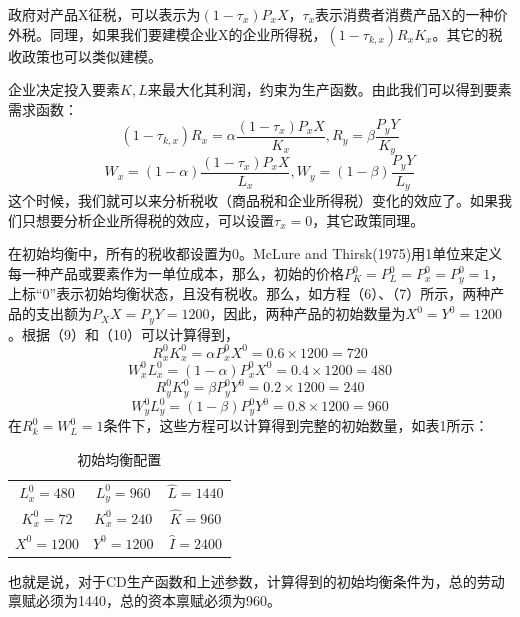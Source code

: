 \documentclass[cn,12pt,math=newtx,citestyle=gb7714-2015,bibstyle=gb7714-2015]{elegantbook}
\begin{document}
	政府对产品X征税，可以表示为$(1-\tau_x)P_xX$，$\tau_x$表示消费者消费产品X的一种价外税。同理，如果我们要建模企业X的企业所得税，$(1-\tau_{k,x})R_xK_x$。其它的税收政策也可以类似建模。
	
	企业决定投入要素$K,L$来最大化其利润，约束为生产函数。由此我们可以得到要素需求函数：
	\begin{equation}
		(1-\tau_{k,x})R_x=\alpha \frac{(1-\tau_x)P_xX}{K_x},R_y=\beta \frac{P_yY}{K_y}
	\end{equation}
	\begin{equation}
		W_x=(1-\alpha) \frac{(1-\tau_x)P_xX}{L_x},W_y=(1-\beta) \frac{P_yY}{L_y}
	\end{equation}
	这个时候，我们就可以来分析税收（商品税和企业所得税）变化的效应了。如果我们只想要分析企业所得税的效应，可以设置$\tau_x=0$，其它政策同理。
	
	在初始均衡中，所有的税收都设置为0。McLure and Thirsk(1975)用1单位来定义每一种产品或要素作为一单位成本，那么，初始的价格$P_K^0=P_L^0=P_x^0=P_y^0=1$，上标“0”表示初始均衡状态，且没有税收。那么，如方程（6）、（7）所示，两种产品的支出额为$P_XX=P_yY=1200$，因此，两种产品的初始数量为$X^0=Y^0=1200$。根据（9）和（10）可以计算得到，
	\begin{equation}
		R_x^0K_x^0=\alpha P_x^0X^0=0.6 \times 1200=720
	\end{equation}
	\begin{equation}
		W_x^0L_x^0=(1-\alpha) P_x^0X^0=0.4 \times 1200=480
	\end{equation}
	\begin{equation}
		R_y^0K_y^0=\beta P_y^0Y^0=0.2 \times 1200=240
	\end{equation}
	\begin{equation}
		W_y^0L_y^0=(1-\beta) P_y^0Y^0=0.8 \times 1200=960
	\end{equation}
	在$R_k^0=W_L^0=1$条件下，这些方程可以计算得到完整的初始数量，如表1所示：
	
	\begin{table}[!htbp]
		\centering
		\caption{初始均衡配置}
		\begin{tabular}{ccc}
			\hline
			$L^0_x=480$& $L^0_y=960$ & $\hat{L}=1440$ \\
			$K^0_x=72$& $K^0_x=240$ &$\hat{K}=960$  \\
			$X^0=1200$& $Y^0=1200$ & $\hat{I}=2400$ \\
			\hline
		\end{tabular}
	\end{table}
	
	也就是说，对于CD生产函数和上述参数，计算得到的初始均衡条件为，总的劳动禀赋必须为1440，总的资本禀赋必须为960。
	
\end{document}

